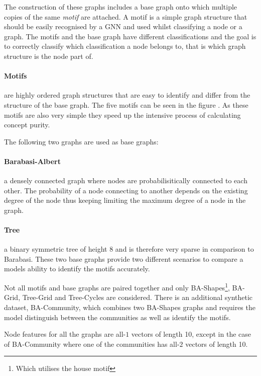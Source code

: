 The construction of these graphs includes a base graph onto which multiple copies of the same \emph{motif} are attached.
A motif is a simple graph structure that should be easily recognised by a GNN and used whilst classifying a node or a graph.
The motifs and the base graph have different classifications and the goal is to correctly classify which classification a node belongs to, that is which graph structure is the node part of.

\paragraph{Motifs} are highly ordered graph structures that are easy to identify and differ from the structure of the base graph.
The five motifs can be seen in the figure .
As these motifs are also very simple they speed up the intensive process of calculating concept purity.

The following two graphs are used as base graphs:

\paragraph{Barabasi-Albert}
a densely connected graph where nodes are probabilisitically connected to each other.
The probability of a node connecting to another depends on the existing degree of the node thus keeping limiting the maximum degree of a node in the graph.

\paragraph{Tree}
a binary symmetric tree of height 8 and is therefore very sparse in comparison to Barabasi.
These two base graphs provide two different scenarios to compare a models ability to identify the motifs accurately.

Not all motifs and base graphs are paired together and only BA-Shapes\footnote{Which utilises the house motif}, BA-Grid, Tree-Grid and Tree-Cycles are considered.
There is an additional synthetic dataset, BA-Community, which combines two BA-Shapes graphs and requires the model distinguish between the communities as well as identify the motifs.

Node features for all the graphs are all-$1$ vectors of length 10, except in the case of BA-Community where one of the communities has all-$2$ vectors of length 10.

